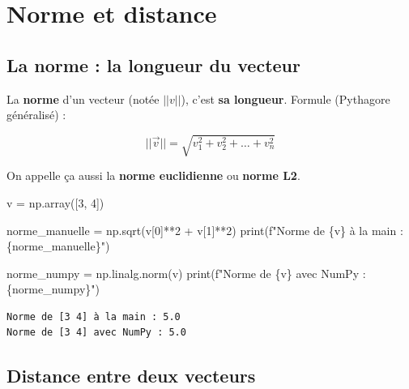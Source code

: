 \documentclass[
  french,
  11pt,
  a4paper,
]{scrbook}
\newenvironment{Shaded}{}{}
\newcommand{\BuiltInTok}[1]{\textcolor[rgb]{0.84,0.23,0.29}{#1}}
\newcommand{\DecValTok}[1]{\textcolor[rgb]{0.00,0.36,0.77}{#1}}
\newcommand{\NormalTok}[1]{\textcolor[rgb]{0.14,0.16,0.18}{#1}}
\newcommand{\OperatorTok}[1]{\textcolor[rgb]{0.14,0.16,0.18}{#1}}
\newcommand{\SpecialCharTok}[1]{\textcolor[rgb]{0.00,0.36,0.77}{#1}}
\newcommand{\SpecialStringTok}[1]{\textcolor[rgb]{0.01,0.18,0.38}{#1}}
\begin{document}
\chapter{Norme et distance}\label{norme-et-distance}

\section{La norme : la longueur du
vecteur}\label{la-norme-la-longueur-du-vecteur}

La \textbf{norme} d'un vecteur (notée \(||v||\)), c'est \textbf{sa
longueur}. Formule (Pythagore généralisé) :

\[||\vec{v}|| = \sqrt{v_1^2 + v_2^2 + \dots + v_n^2}\]

On appelle ça aussi la \textbf{norme euclidienne} ou \textbf{norme L2}.

\begin{Shaded}
\begin{Highlighting}[]
\NormalTok{v }\OperatorTok{=}\NormalTok{ np.array([}\DecValTok{3}\NormalTok{, }\DecValTok{4}\NormalTok{])}

\NormalTok{norme\_manuelle }\OperatorTok{=}\NormalTok{ np.sqrt(v[}\DecValTok{0}\NormalTok{]}\OperatorTok{**}\DecValTok{2} \OperatorTok{+}\NormalTok{ v[}\DecValTok{1}\NormalTok{]}\OperatorTok{**}\DecValTok{2}\NormalTok{)}
\BuiltInTok{print}\NormalTok{(}\SpecialStringTok{f"Norme de }\SpecialCharTok{\{}\NormalTok{v}\SpecialCharTok{\}}\SpecialStringTok{ à la main : }\SpecialCharTok{\{}\NormalTok{norme\_manuelle}\SpecialCharTok{\}}\SpecialStringTok{"}\NormalTok{)}

\NormalTok{norme\_numpy }\OperatorTok{=}\NormalTok{ np.linalg.norm(v)}
\BuiltInTok{print}\NormalTok{(}\SpecialStringTok{f"Norme de }\SpecialCharTok{\{}\NormalTok{v}\SpecialCharTok{\}}\SpecialStringTok{ avec NumPy : }\SpecialCharTok{\{}\NormalTok{norme\_numpy}\SpecialCharTok{\}}\SpecialStringTok{"}\NormalTok{)}
\end{Highlighting}
\end{Shaded}

\begin{verbatim}
Norme de [3 4] à la main : 5.0
Norme de [3 4] avec NumPy : 5.0
\end{verbatim}

\section{Distance entre deux
vecteurs}\label{distance-entre-deux-vecteurs}
\end{document}
